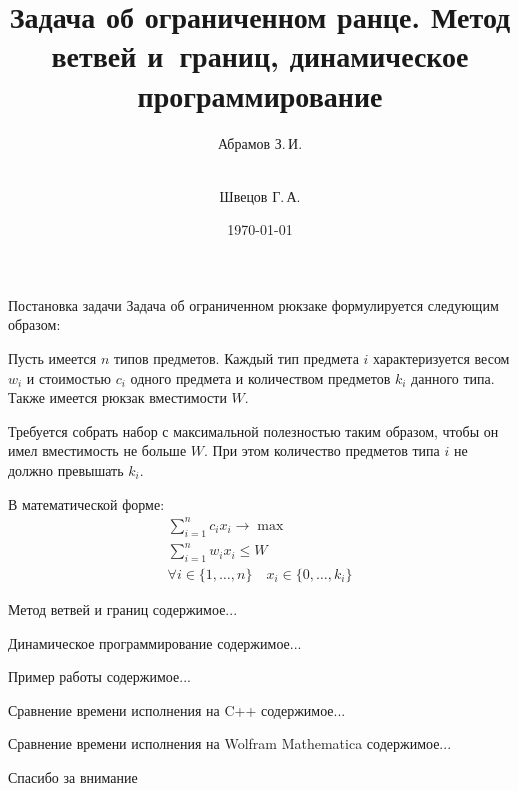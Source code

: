 \documentclass[ignoreonframetext,unicode]{beamer}
\institute[каф. Прикладная математика ФН-2]{группа ФН2-42Б}
\date{\today}
\title[Задача об ограниченном ранце]{Задача об ограниченном ранце. Метод ветвей и~границ, динамическое программирование}
\author[Абрамов З.\,И., Швецов Г.\,A.]{Абрамов З.\,И.\and\\[0.5mm] Швецов Г.\,А.}
\begin{document}
	\begin{frame}[plain]
		\maketitle
	\end{frame}

	\begin{frame}{Постановка задачи}
		Задача об ограниченном рюкзаке формулируется следующим образом:
		
		Пусть имеется $n$ типов предметов. Каждый тип предмета $i$ характеризуется весом $w_i$ и стоимостью $c_i$ одного предмета и количеством предметов $k_i$ данного типа. Также имеется рюкзак вместимости $W$.
		
		Требуется собрать набор с максимальной полезностью таким образом, чтобы он имел вместимость не больше $W$. При этом количество предметов типа $i$ не должно превышать $k_i$.
		
		В математической форме:
		\begin{gather*}
			\sum_{i=1}^{n} c_i x_i \to \max \\
			\sum_{i=1}^{n} w_i x_i \leqslant W \\
			\forall i\in\{1,\dots,n\} \quad x_i \in \{0,\dots, k_i\}
		\end{gather*}
	\end{frame}

	\begin{frame}{Метод ветвей и границ}
		содержимое...
	\end{frame}


	\begin{frame}{Динамическое программирование}
		содержимое...
	\end{frame}


	\begin{frame}{Пример работы}
		содержимое...
	\end{frame}

	\begin{frame}{Сравнение времени исполнения на C++}
		содержимое...
	\end{frame}

	\begin{frame}{Сравнение времени исполнения на Wolfram Mathematica}
		содержимое...
	\end{frame}

	\begin{frame}
		Спасибо за внимание
	\end{frame}
\end{document}
